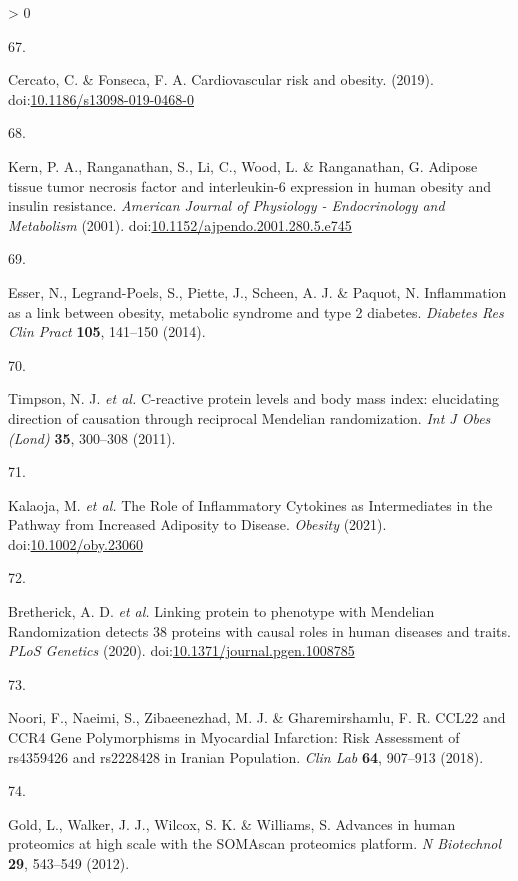 \documentclass[11pt,twoside]{bristolthesis}
\newlength{\cslhangindent}
\newlength{\csllabelwidth}
\newenvironment{CSLReferences}[2] %
 {%
  \setlength{\parindent}{0pt}
  \ifodd #1 \everypar{\setlength{\hangindent}{\cslhangindent}}\ignorespaces\fi
  \ifnum #2 > 0
  \setlength{\parskip}{#2\baselineskip}
  \fi
 }%
 {}
\newcommand{\CSLLeftMargin}[1]{\parbox[t]{\csllabelwidth}{#1}}
\newcommand{\CSLRightInline}[1]{\parbox[t]{\linewidth - \csllabelwidth}{#1}\break}
\begin{document}
\begin{CSLReferences}{0}{0}
\leavevmode\hypertarget{ref-Cercato2019}{}%
\CSLLeftMargin{67. }
\CSLRightInline{Cercato, C. \& Fonseca, F. A. {Cardiovascular risk and obesity}. (2019). doi:\href{https://doi.org/10.1186/s13098-019-0468-0}{10.1186/s13098-019-0468-0}}

\leavevmode\hypertarget{ref-Kern2001}{}%
\CSLLeftMargin{68. }
\CSLRightInline{Kern, P. A., Ranganathan, S., Li, C., Wood, L. \& Ranganathan, G. {Adipose tissue tumor necrosis factor and interleukin-6 expression in human obesity and insulin resistance}. \emph{American Journal of Physiology - Endocrinology and Metabolism} (2001). doi:\href{https://doi.org/10.1152/ajpendo.2001.280.5.e745}{10.1152/ajpendo.2001.280.5.e745}}

\leavevmode\hypertarget{ref-Esser2014}{}%
\CSLLeftMargin{69. }
\CSLRightInline{Esser, N., Legrand-Poels, S., Piette, J., Scheen, A. J. \& Paquot, N. {Inflammation as a link between obesity, metabolic syndrome and type 2 diabetes}. \emph{Diabetes Res Clin Pract} \textbf{105}, 141--150 (2014).}

\leavevmode\hypertarget{ref-Timpson2011}{}%
\CSLLeftMargin{70. }
\CSLRightInline{Timpson, N. J. \emph{et al.} {C-reactive protein levels and body mass index: elucidating direction of causation through reciprocal Mendelian randomization}. \emph{Int J Obes (Lond)} \textbf{35}, 300--308 (2011).}

\leavevmode\hypertarget{ref-Kalaoja2021}{}%
\CSLLeftMargin{71. }
\CSLRightInline{Kalaoja, M. \emph{et al.} {The Role of Inflammatory Cytokines as Intermediates in the Pathway from Increased Adiposity to Disease}. \emph{Obesity} (2021). doi:\href{https://doi.org/10.1002/oby.23060}{10.1002/oby.23060}}

\leavevmode\hypertarget{ref-Bretherick2020}{}%
\CSLLeftMargin{72. }
\CSLRightInline{Bretherick, A. D. \emph{et al.} {Linking protein to phenotype with Mendelian Randomization detects 38 proteins with causal roles in human diseases and traits}. \emph{PLoS Genetics} (2020). doi:\href{https://doi.org/10.1371/journal.pgen.1008785}{10.1371/journal.pgen.1008785}}

\leavevmode\hypertarget{ref-Noori2018}{}%
\CSLLeftMargin{73. }
\CSLRightInline{Noori, F., Naeimi, S., Zibaeenezhad, M. J. \& Gharemirshamlu, F. R. {CCL22 and CCR4 Gene Polymorphisms in Myocardial Infarction: Risk Assessment of rs4359426 and rs2228428 in Iranian Population}. \emph{Clin Lab} \textbf{64}, 907--913 (2018).}

\leavevmode\hypertarget{ref-Gold2012}{}%
\CSLLeftMargin{74. }
\CSLRightInline{Gold, L., Walker, J. J., Wilcox, S. K. \& Williams, S. {Advances in human proteomics at high scale with the SOMAscan proteomics platform}. \emph{N Biotechnol} \textbf{29}, 543--549 (2012).}


\end{CSLReferences}
\end{document}
